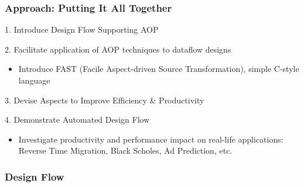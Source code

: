 \begin{frame}
  \frametitle{Approach: Putting It All Together}
  \begin{beamerboxesrounded}{1. Introduce Design Flow Supporting AOP}
  \end{beamerboxesrounded}
  \begin{beamerboxesrounded}{2. Facilitate application of AOP
      techniques to dataflow designs}
    \begin{itemize}
    \item Introduce FAST (Facile Aspect-driven Source Transformation),
      simple C-style language
    \end{itemize}
  \end{beamerboxesrounded}

  \begin{beamerboxesrounded}{3. Devise Aspects to Improve Efficiency
      \& Productivity}
  \end{beamerboxesrounded}

  \begin{beamerboxesrounded}{4. Demonstrate Automated Design Flow}
    \begin{itemize}
    \item Investigate productivity and performance impact on real-life
      applications: Reverse Time Migration, Black Scholes, Ad
      Prediction, etc.
    \end{itemize}
  \end{beamerboxesrounded}
\end{frame}

\begin{frame}
  \frametitle{Design Flow}
  \vspace{-0.3cm}
  \begin{figure}
    \centering
    \def\svgwidth{0.88\textwidth}
    
  \end{figure}
\end{frame}